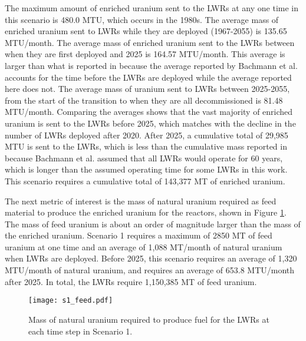 The maximum amount of enriched uranium sent to the \glspl{LWR} at any one 
time in this scenario is 480.0 MTU, which occurs in the 1980s. The 
average mass of enriched uranium sent to 
\glspl{LWR} while they are deployed (1967-2055) is 135.65 MTU/month. The average 
mass of 
enriched uranium sent to the \glspl{LWR} between when they are first deployed 
and 2025 is 164.57 MTU/month. This average is larger than what is reported in 
\cite{bachmann_enrichment_2021} because the average reported by 
Bachmann et al. accounts for the time before the \glspl{LWR} are  
deployed while the average reported here does not. The average mass of 
uranium sent to \glspl{LWR} between 2025-2055, from the start of the transition 
to when they are all decommissioned is 81.48 MTU/month. Comparing the averages 
shows that the vast majority of enriched uranium is sent to the \glspl{LWR} 
before 2025, which matches with the decline in the number of \glspl{LWR} 
deployed after 2020. After 2025, a cumulative total of 29,985 MTU is 
sent to the \glspl{LWR},
which is less than the cumulative mass reported in \cite{bachmann_enrichment_2021}
because Bachmann et al. assumed that all \glspl{LWR} would operate for 60 years, 
which is longer than the assumed operating time for some \glspl{LWR} in 
this work. This scenario requires a cumulative total of 143,377 MT of enriched uranium.

The next metric of interest is the mass of natural uranium 
required as feed material to produce the enriched uranium for the 
reactors, shown in Figure \ref{fig:feed1}. The mass of feed uranium 
is about an order of magnitude larger than the mass of the enriched uranium. 
Scenario 1 requires a maximum of 2850 MT of 
feed uranium at one time and an average of 1,088 MT/month of natural uranium 
when \glspl{LWR} are deployed. Before 2025, this scenario requires an average of 
1,320 MTU/month of natural uranium, and requires an average of 653.8 MTU/month 
after 2025. In total, the \glspl{LWR} require 1,150,385 MT of feed uranium.

\begin{figure}[h!]
    \centering
    \texttt{[image: s1\_feed.pdf]}
    \caption{Mass of natural uranium required to produce fuel for the LWRs at each 
    time step in Scenario 1.}
    \label{fig:feed1}
\end{figure}

